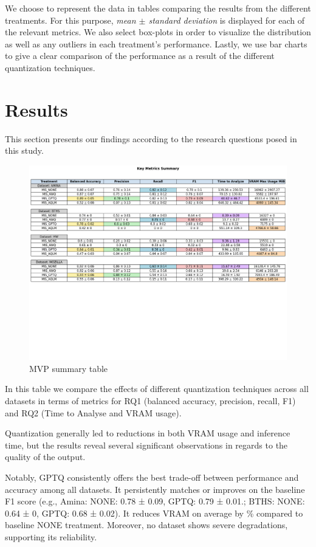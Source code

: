 \documentclass[conference]{IEEEtran}
\begin{document}
We choose to represent the data in tables comparing the results from the different treatments. For this purpose, \textit{mean $\pm$ standard deviation} is displayed for each of the relevant metrics. We also select box-plots in order to visualize the distribution as well as any outliers in each treatment's performance. Lastly, we use bar charts to give a clear comparison of the performance as a result of the different quantization techniques.

\section{Results}

This section presents our findings according to the research questions posed in this study.

\begin{figure}[H]
    \centering
    \includegraphics[width=0.95\columnwidth]{images/MVP_summary_table.png}
    \caption{MVP summary table}
    \label{fig:mvp-table}
\end{figure}

In this table we compare the effects of different quantization techniques across all datasets in terms of metrics for RQ1 (balanced accuracy, precision, recall, F1) and RQ2 (Time to Analyse and VRAM usage).
 
Quantization generally led to reductions in both VRAM usage and inference time, but the results reveal several significant observations in regards to the quality of the output.

Notably, GPTQ consistently offers the best trade-off between performance and accuracy among all datasets. It persistently matches or improves on the baseline F1 score (e.g., Amina: NONE: 0.78 ± 0.09, GPTQ: 0.79 ± 0.01.; BTHS: NONE: 0.64 ± 0, GPTQ: 0.68 ± 0.02). It reduces VRAM on average by \% compared to baseline NONE treatment. Moreover, no dataset shows severe degradations, supporting its reliability.
\end{document}
